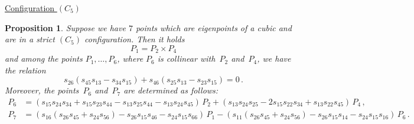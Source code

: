 \documentclass{amsart}
\theoremstyle{plain}
\newtheorem{prop}[lemma]{Proposition}
\theoremstyle{definition}
\begin{document}
\underline{Configuration $(C_5)$}
\begin{prop}
\label{proposition:condition_5}
Suppose we have $7$ points which are eigenpoints of a cubic and are in a strict $(C_5)$ configuration.
Then it holds
%
\[
  P_1 = P_2 \times P_4 
\]
%
and among the points $P_1, \dots, P_6$, where $P_6$ is collinear with~$P_2$ and~$P_4$, we have the relation
%
\begin{equation}
\label{cndC5}
  s_{26}(s_{45}s_{13}-s_{34}s_{15})+s_{46}(s_{25}s_{13}-s_{23}s_{15}) = 0 \,.
\end{equation}
%
Moreover, the points~$P_6$ and~$P_7$ are determined as follows:
%
\begin{align}
  P_6 &= (s_{15}s_{24}s_{34}+s_{15}s_{23}s_{44} -s_{13}s_{25}s_{44} -s_{13}s_{24}s_{45}) \, P_2 + (s_{13}s_{24}s_{25}-2s_{15}s_{22}s_{34}+s_{13}s_{22}s_{45}) \, P_4 \,, \label{p6formula} \\
  P_7 &= (s_{16}(s_{26}s_{45}+s_{24}s_{56})-s_{26}s_{15}s_{46}-s_{24}s_{15}s_{66}) \, P_1-
  (s_{11}(s_{26}s_{45}+s_{24}s_{56})-s_{26}s_{15}s_{14}-s_{24}s_{15}s_{16}) \, P_6 \,.
  \label{p7formula}
\end{align}
%
\end{prop}
\end{document}
